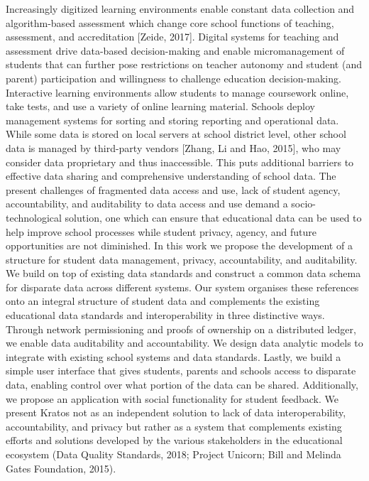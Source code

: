 \documentclass{article}
\begin{document}
\bigbreak
Increasingly digitized learning environments enable constant data collection and algorithm-based assessment which change core school functions of teaching, assessment, and accreditation [Zeide, 2017]. Digital systems for teaching and assessment drive data-based decision-making and enable micromanagement of students that can further pose restrictions on teacher autonomy and student (and parent) participation and willingness to challenge education decision-making. Interactive learning environments allow students to manage coursework online, take tests, and use a variety of online learning material. Schools deploy management systems for sorting and storing reporting and operational data. While some data is stored on local servers at school district level, other school data is managed by third-party vendors [Zhang, Li and Hao, 2015], who may consider data proprietary and thus inaccessible. This puts additional barriers to effective data sharing and comprehensive understanding of school data.
\bigbreak
The present challenges of fragmented data access and use, lack of student agency, accountability, and auditability to data access and use demand a socio-technological solution, one which can ensure that educational data can be used to help improve school processes while student privacy, agency, and future opportunities are not diminished.
\bigbreak
In this work we propose the development of a structure for student data management, privacy, accountability, and auditability. We build on top of existing data standards and construct a common data schema for disparate data across different systems. Our system organises these references onto an integral structure of student data and complements the existing educational data standards and interoperability in three distinctive ways. Through network permissioning and proofs of ownership on a distributed ledger, we enable data auditability and accountability. We design data analytic models to integrate with existing school systems and data standards. Lastly, we build a simple user interface that gives students, parents and schools access to disparate data, enabling control over what portion of the data can be shared. Additionally, we propose an application with social functionality for student feedback.
\bigbreak
We present Kratos not as an independent solution to lack of data interoperability, accountability, and privacy but rather as a system that complements existing efforts and solutions developed by the various stakeholders in the educational ecosystem (Data Quality Standards, 2018; Project Unicorn; Bill and Melinda Gates Foundation, 2015).
\end{document}
